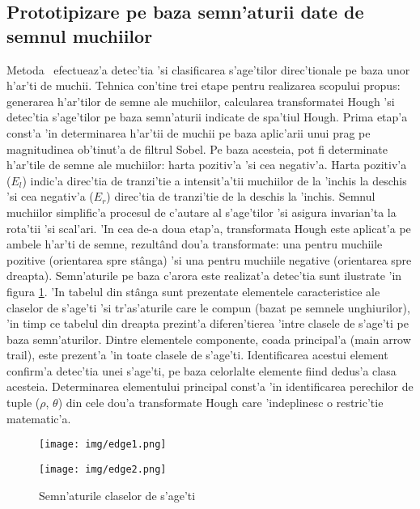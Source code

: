 \documentclass[12pt,a4paper,twoside]{report}
\begin{document}
\subsection{Prototipizare pe baza semn'aturii date de semnul muchiilor}
Metoda~\cite{EdgeSignature} efectueaz'a detec'tia 'si clasificarea s'age'tilor direc'tionale pe baza unor h'ar'ti de muchii. Tehnica con'tine trei etape pentru realizarea scopului propus: generarea h'ar'tilor de semne ale muchiilor, calcularea transformatei Hough 'si detec'tia s'age'tilor pe baza semn'aturii indicate de spa'tiul Hough. Prima etap'a const'a 'in determinarea h'ar'tii de muchii pe baza aplic'arii unui prag pe magnitudinea ob'tinut'a de filtrul Sobel. Pe baza acesteia, pot fi determinate h'ar'tile de semne ale muchiilor: harta pozitiv'a 'si cea negativ'a. Harta pozitiv'a ($E_l$) indic'a direc'tia de tranzi'tie a intensit'a'tii muchiilor de la 'inchis la deschis 'si cea negativ'a ($E_r$) direc'tia de tranzi'tie de la deschis la 'inchis. Semnul muchiilor simplific'a procesul de c'autare al s'age'tilor 'si asigura invarian'ta la rota'tii 'si scal'ari. 'In cea de-a doua etap'a, transformata Hough este aplicat'a pe ambele h'ar'ti de semne, rezult\^and dou'a transformate: una pentru muchiile pozitive (orientarea spre st\^anga) 'si una pentru muchiile negative (orientarea spre dreapta). Semn'aturile pe baza c'arora este realizat'a detec'tia sunt ilustrate 'in figura \ref{fig:semnaturi}. 'In tabelul din st\^anga sunt prezentate elementele caracteristice ale claselor de s'age'ti 'si tr'as'aturile care le compun (bazat pe semnele unghiurilor), 'in timp ce tabelul din dreapta prezint'a diferen'tierea 'intre clasele de s'age'ti pe baza semn'aturilor. Dintre elementele componente, coada principal'a (main arrow trail), este prezent'a 'in toate clasele de s'age'ti. Identificarea acestui element confirm'a detec'tia unei s'age'ti, pe baza celorlalte elemente fiind dedus'a clasa acesteia. Determinarea elementului principal const'a 'in identificarea perechilor de tuple ($\rho$, $\theta$) din cele dou'a transformate Hough care 'indeplinesc o restric'tie matematic'a.

\begin{figure}[H]
\centering
\begin{minipage}{.5\textwidth}
  \centering
  \texttt{[image: img/edge1.png]}
\end{minipage}%
\begin{minipage}{.5\textwidth}
  \centering
  \texttt{[image: img/edge2.png]}
\end{minipage}
\caption{Semn'aturile claselor de s'age'ti \protect \footnotemark}
\label{fig:semnaturi}
\end{figure}
\end{document}
